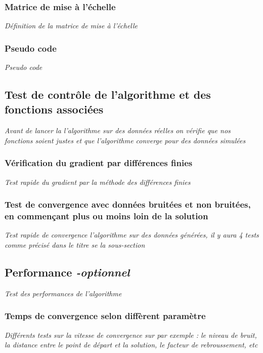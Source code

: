 \documentclass{article}
\begin{document}
\subsubsection{Matrice de mise à l'échelle}
\textit{Définition de la matrice de mise à l'échelle}

\subsubsection{Pseudo code}
\textit{Pseudo code}

\subsection{Test de contrôle de l'algorithme et des fonctions associées}
\textit{Avant de lancer la l'algorithme sur des données réelles on vérifie que nos fonctions soient justes et que l'algorithme converge pour des données simulées}

\subsubsection{Vérification du gradient par différences finies}
\textit{Test rapide du gradient par la méthode des différences finies}

\subsubsection{Test de convergence avec données bruitées et non bruitées, en commençant plus ou moins loin de la solution}
\textit{Test rapide de convergence l'algorithme sur des données générées, il y aura 4 tests comme précisé dans le titre se la sous-section}

\subsection{Performance \textit{-optionnel}}
\textit{Test des performances de l'algorithme}

\subsubsection{Temps de convergence selon diffèrent paramètre}
\textit{Différents tests sur la vitesse de convergence sur par exemple : le niveau de bruit, la distance entre le point de départ et la solution, le facteur de rebroussement, etc }
\end{document}
